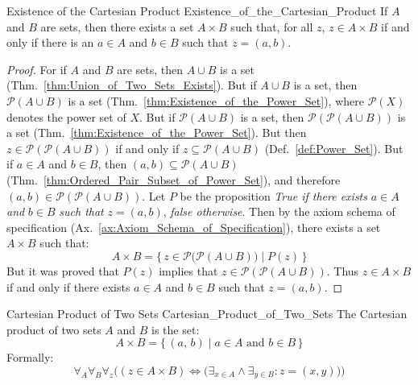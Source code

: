         \begin{ltheorem}{Existence of the Cartesian Product}
                        {Existence_of_the_Cartesian_Product}
            If $A$ and $B$ are sets, then there exists a set $A\times{B}$
            such that, for all $z$, $z\in{A}\times{B}$ if and only if there
            is an $a\in{A}$ and $b\in{B}$ such that $z=(a,b)$.
        \end{ltheorem}
        \begin{proof}
            For if $A$ and $B$ are sets, then $A\cup{B}$ is a set
            (Thm.~\ref{thm:Union_of_Two_Sets_Exists}). But if $A\cup{B}$ is a
            set, then $\mathcal{P}(A\cup{B})$ is a set
            (Thm.~\ref{thm:Existence_of_the_Power_Set}), where $\mathcal{P}(X)$
            denotes the power set of $X$. But if $\mathcal{P}(A\cup{B})$ is a
            set, then $\mathcal{P}(\mathcal{P}(A\cup{B}))$ is a set
            (Thm.~\ref{thm:Existence_of_the_Power_Set}). But then
            $z\in\mathcal{P}(\mathcal{P}(A\cup{B}))$ if and only if
            $z\subseteq\mathcal{P}(A\cup{B})$ (Def.~\ref{def:Power_Set}).
            But if $a\in{A}$ and $b\in{B}$, then
            $(a,b)\subseteq\mathcal{P}(A\cup{B})$
            (Thm.~\ref{thm:Ordered_Pair_Subset_of_Power_Set}), and therefore
            $(a,b)\in\mathcal{P}(\mathcal{P}(A\cup{B}))$. Let $P$ be the
            proposition \textit{True if there exists} $a\in{A}$ \textit{and}
            $b\in{B}$ \textit{such that} $z=(a,b)$, \textit{false otherwise}.
            Then by the axiom schema of specification
            (Ax.~\ref{ax:Axiom_Schema_of_Specification}), there exists a
            set $A\times{B}$ such that:
            \begin{equation}
                A\times{B}=
                \{\,z\in\mathcal{P}\big(\mathcal{P}(A\cup{B})\big)\;|\;
                    P(z)\,\}
            \end{equation}
            But it was proved that $P(z)$ implies that
            $z\in\mathcal{P}(\mathcal{P}(A\cup{B}))$. Thus $z\in{A}\times{B}$
            if and only if there exists $a\in{A}$ and $b\in{B}$
            such that $z=(a,b)$.
        \end{proof}
        \begin{fdefinition}{Cartesian Product of Two Sets}
                           {Cartesian_Product_of_Two_Sets}
            The \gls{Cartesian product} of two \glspl{set} $A$ and $B$ is the
            set:
            \begin{equation*}
                A\times{B}
                =\{\,(a,\,b)\;|\;a\in{A}\textrm{ and }b\in{B}\,\}
            \end{equation*}
            Formally:
            \begin{equation*}
                \forall_{A}\forall_{B}\forall_{z}\Big(
                    (z\in{A}\times{B})\Longleftrightarrow
                    \big(\exists_{x\in{A}}\land\exists_{y\in{B}}:z=(x,y)\big)
                \Big)
            \end{equation*}
        \end{fdefinition}
